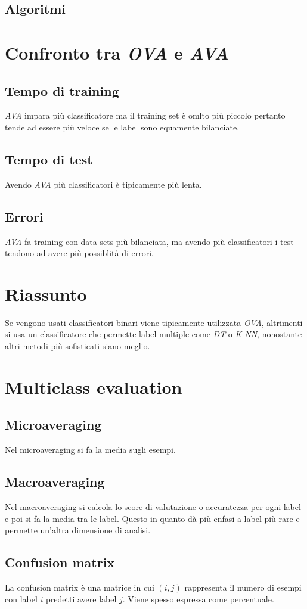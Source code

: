 	\subsection{Algoritmi}
	
	

\section{Confronto tra \emph{OVA} e \emph{AVA}}

	\subsection{Tempo di training}
	\emph{AVA} impara pi\`u classificatore ma il training set \`e omlto pi\`u piccolo pertanto tende ad essere pi\`u veloce se le label sono equamente bilanciate.

	\subsection{Tempo di test}
	Avendo \emph{AVA} pi\`u classificatori \`e tipicamente pi\`u lenta.

	\subsection{Errori}
	\emph{AVA} fa training con data sets pi\`u bilanciata, ma avendo pi\`u classificatori i test tendono ad avere pi\`u possiblit\`a di errori.

\section{Riassunto}
Se vengono usati classificatori binari viene tipicamente utilizzata  \emph{OVA}, altrimenti si usa un classificatore che permette label multiple come \emph{DT} o \emph{K-NN}, nonostante altri metodi pi\`u sofisticati siano meglio.

\section{Multiclass evaluation}

	\subsection{Microaveraging}
	Nel microaveraging si fa la media sugli esempi.

	\subsection{Macroaveraging}
	Nel macroaveraging si calcola lo score di valutazione o accuratezza per ogni label e poi si fa la media tra le label.
	Questo in quanto d\`a pi\`u enfasi a label pi\`u rare e permette un'altra dimensione di analisi.

	\subsection{Confusion matrix}
	La confusion matrix \`e una matrice in cui $(i, j)$ rappresenta il numero di esempi con label $i$ predetti avere label $j$.
	Viene spesso espressa come percentuale.

